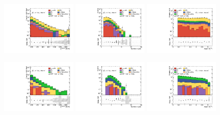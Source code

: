 \begin{figure}[ht!]
  \begin{center}

    \includegraphics[width=0.32\textwidth]{images/results/fr2_unblind/can_CRW_ph_pt0_afterFit.pdf}
    \includegraphics[width=0.32\textwidth]{images/results/fr2_unblind/can_CRW_jet_n_afterFit.pdf}
    \includegraphics[width=0.32\textwidth]{images/results/fr2_unblind/can_CRW_dphi_jetmet_afterFit.pdf}

    \includegraphics[width=0.32\textwidth]{images/results/fr2_unblind/can_CRT_ph_pt0_afterFit.pdf}
    \includegraphics[width=0.32\textwidth]{images/results/fr2_unblind/can_CRT_jet_n_afterFit.pdf}
    \includegraphics[width=0.32\textwidth]{images/results/fr2_unblind/can_CRT_dphi_jetmet_afterFit.pdf}


\end{center}
\end{figure}
